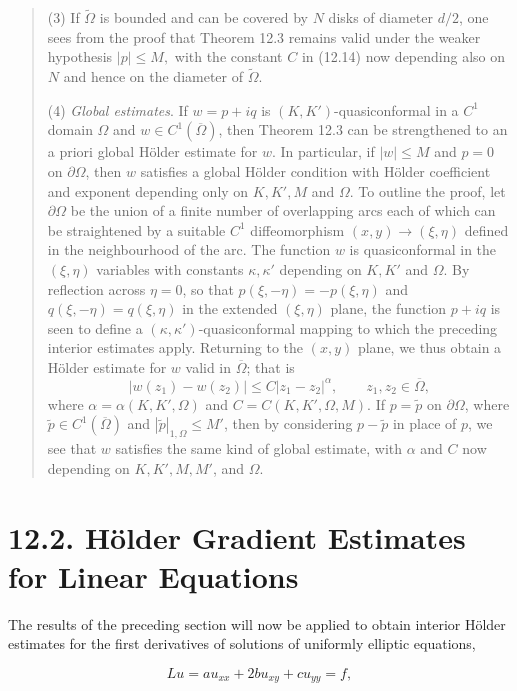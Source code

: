 \begin{quote}
(3) If $\tilde{\Omega}$ is bounded and can be covered by $N$ disks of diameter $d/2$, one sees from the proof that Theorem 12.3 remains valid under the weaker hypothesis
$
|p|\le M,
$
with the constant $C$ in (12.14) now depending also on $N$ and hence on the diameter of $\tilde{\Omega}$.

(4) \emph{Global estimates}. If $w=p+iq$ is $(K, K')$-quasiconformal in a $C^1$ domain $\Omega$ and $w\in C^1(\overline{\Omega})$, then Theorem 12.3 can be strengthened to an a priori global Hölder estimate for $w$. In particular, if $|w|\le M$ and $p=0$ on $\partial\Omega$, then $w$ satisfies a global Hölder condition with Hölder coefficient and exponent depending only on $K, K', M$ and $\Omega$. To outline the proof, let $\partial\Omega$ be the union of a finite number of overlapping arcs each of which can be straightened by a suitable $C^1$ diffeomorphism $(x,y)\to(\xi,\eta)$ defined in the neighbourhood of the arc. The function $w$ is quasiconformal in the $(\xi,\eta)$ variables with constants $\kappa, \kappa'$ depending on $K, K'$ and $\Omega$. By reflection across $\eta=0$, so that $p(\xi,-\eta)=-p(\xi,\eta)$ and $q(\xi,-\eta)=q(\xi,\eta)$ in the extended $(\xi,\eta)$ plane, the function $p+iq$ is seen to define a $(\kappa,\kappa')$-quasiconformal mapping to which the preceding interior estimates apply. Returning to the $(x,y)$ plane, we thus obtain a Hölder estimate for $w$ valid in $\overline{\Omega}$; that is
$$
|w(z_1)-w(z_2)|\le C|z_1-z_2|^\alpha,\qquad z_1,z_2\in\overline{\Omega},
$$
where $\alpha=\alpha(K,K',\Omega)$ and $C=C(K,K',\Omega,M)$. If $p=\tilde p$ on $\partial\Omega$, where $\tilde p\in C^1(\overline{\Omega})$ and $|\tilde p|_{1,\Omega}\le M'$, then by considering $p-\tilde p$ in place of $p$, we see that $w$ satisfies the same kind of global estimate, with $\alpha$ and $C$ now depending on $K,K',M,M'$, and $\Omega$.
\end{quote}

\section*{12.2. Hölder Gradient Estimates for Linear Equations}

The results of the preceding section will now be applied to obtain interior Hölder estimates for the first derivatives of solutions of uniformly elliptic equations,

\begin{equation}
\tag{12.15}
Lu = au_{xx}+2bu_{xy}+cu_{yy}=f,
\end{equation}

